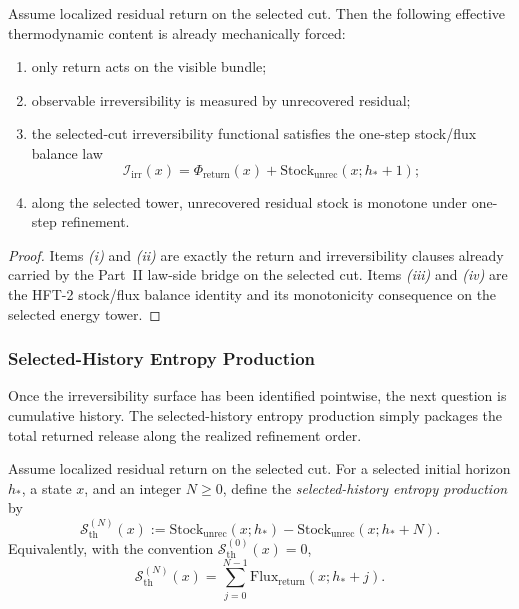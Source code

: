 \begin{theorem}
\label{thm:effective-thermodynamic-closure}
Assume localized residual return on the selected cut. Then the following
effective thermodynamic content is already mechanically forced:
\begin{enumerate}[label=(\roman*), leftmargin=2em, itemsep=0.2em]
\item only return acts on the visible bundle;
\item observable irreversibility is measured by unrecovered residual;
\item the selected-cut irreversibility functional satisfies the one-step
      stock/flux balance law
      \[
      \mathcal I_{\mathrm{irr}}(x)
      =
      \Phi_{\mathrm{return}}(x)
      +
      \mathrm{Stock}_{\mathrm{unrec}}(x;h_\ast+1);
      \]
\item along the selected tower, unrecovered residual stock is monotone under
      one-step refinement.
\end{enumerate}
\end{theorem}

\begin{proof}
Items \emph{(i)} and \emph{(ii)} are exactly the return and irreversibility
clauses already carried by the Part~II law-side bridge on the selected cut. Items
\emph{(iii)} and \emph{(iv)} are the HFT-2 stock/flux balance identity and its
monotonicity consequence on the selected energy tower.
\end{proof}

\subsubsection{Selected-History Entropy Production}

Once the irreversibility surface has been identified pointwise, the next
question is cumulative history. The selected-history entropy production simply
packages the total returned release along the realized refinement order.

\begin{definition}
\label{def:selected-history-entropy-production}
Assume localized residual return on the selected cut. For a selected initial
horizon \(h_\ast\), a state \(x\), and an integer \(N\ge 0\), define the
\emph{selected-history entropy production} by
\[
\mathcal S_{\mathrm{th}}^{(N)}(x)
:=
\mathrm{Stock}_{\mathrm{unrec}}(x;h_\ast)
-
\mathrm{Stock}_{\mathrm{unrec}}(x;h_\ast+N).
\]
Equivalently, with the convention \(\mathcal S_{\mathrm{th}}^{(0)}(x)=0\),
\[
\mathcal S_{\mathrm{th}}^{(N)}(x)
=
\sum_{j=0}^{N-1}\mathrm{Flux}_{\mathrm{return}}(x;h_\ast+j).
\]
\end{definition}

